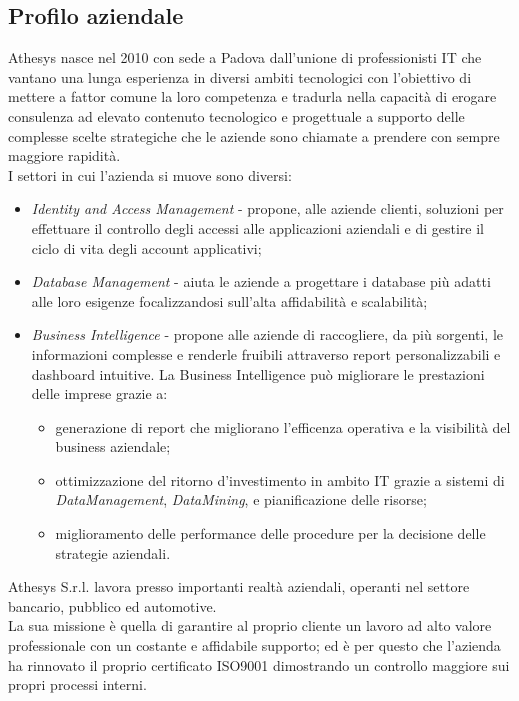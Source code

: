 \subsection{Profilo aziendale}
Athesys nasce nel 2010 con sede a Padova dall’unione di professionisti IT che vantano una lunga esperienza in diversi ambiti tecnologici con l’obiettivo di mettere a fattor comune la loro competenza e tradurla nella capacità di erogare consulenza ad elevato contenuto tecnologico e progettuale a supporto delle complesse scelte strategiche che le aziende sono chiamate a prendere con sempre maggiore rapidità\cite{athesys}.\\
I settori in cui l'azienda si muove sono diversi:
\begin{itemize}
	\item \textit{Identity and Access Management} - propone, alle aziende clienti, soluzioni per effettuare il controllo degli accessi alle applicazioni aziendali e di gestire il ciclo di vita degli account applicativi;
	\item \textit{Database Management} - aiuta le aziende a progettare i database più adatti alle loro esigenze focalizzandosi sull'alta affidabilità e scalabilità;
	\item \textit{Business Intelligence} - propone alle aziende di raccogliere, da più sorgenti, le informazioni complesse e renderle fruibili attraverso report personalizzabili e dashboard intuitive. La Business Intelligence può migliorare le prestazioni delle imprese grazie a:
	\begin{itemize}
		\item generazione di report che migliorano l'efficenza operativa e la visibilità del business aziendale;
		\item ottimizzazione del ritorno d'investimento in ambito IT grazie a sistemi di \emph{\gls{DataManagement}}\glsfirstoccur, \emph{\gls{DataMining}}\glsfirstoccur, e pianificazione delle risorse;
		\item miglioramento delle performance delle procedure per la decisione delle strategie aziendali.
	\end{itemize} 
\end{itemize}
Athesys S.r.l. lavora presso importanti realtà aziendali, operanti nel settore bancario, pubblico ed automotive.\\
La sua missione è quella di garantire al proprio cliente un lavoro ad alto valore professionale con un costante e affidabile supporto; ed è per questo che l'azienda ha rinnovato il proprio certificato ISO9001 dimostrando un controllo maggiore sui propri processi interni.\\

